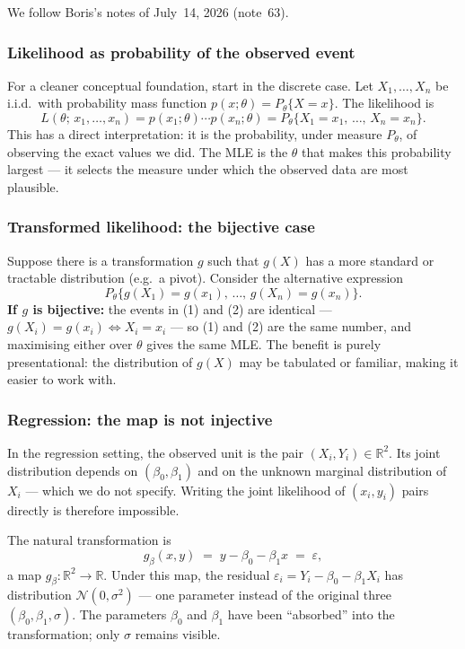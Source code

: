 \documentclass[a4paper,oneside,12pt]{extarticle}
\theoremstyle{plain}
\theoremstyle{definition}
\theoremstyle{remark}
\begin{document}
We follow Boris's notes of July~14, 2026 (note~63).

\subsubsection*{Likelihood as probability of the observed event}

For a cleaner conceptual foundation, start in the discrete case.
Let $X_1,\ldots,X_n$ be i.i.d.\ with probability mass function
$p(x;\theta) = P_\theta\{X = x\}$.  The likelihood is
\[
  L(\theta;\,x_1,\ldots,x_n)
  = p(x_1;\theta)\cdots p(x_n;\theta)
  = P_\theta\{X_1 = x_1,\,\ldots,\,X_n = x_n\}.
  \tag{1}
\]
This has a direct interpretation: it is the probability, under
measure $P_\theta$, of observing the exact values we did.
The MLE is the $\theta$ that makes this probability largest ---
it selects the measure under which the observed data are most
plausible.

\subsubsection*{Transformed likelihood: the bijective case}

Suppose there is a transformation $g$ such that $g(X)$ has a more
standard or tractable distribution (e.g.\ a pivot).  Consider the
alternative expression
\[
  P_\theta\{g(X_1) = g(x_1),\,\ldots,\,g(X_n) = g(x_n)\}.
  \tag{2}
\]
\textbf{If $g$ is bijective:} the events in (1) and (2) are
identical --- $g(X_i) = g(x_i) \Leftrightarrow X_i = x_i$ ---
so (1) and (2) are the same number, and maximising either over
$\theta$ gives the same MLE.  The benefit is purely
presentational: the distribution of $g(X)$ may be tabulated or
familiar, making it easier to work with.

\subsubsection*{Regression: the map is not injective}

In the regression setting, the observed unit is the pair
$(X_i, Y_i) \in \mathbb{R}^2$.  Its joint distribution depends on
$(\beta_0, \beta_1)$ and on the unknown marginal distribution of
$X_i$ --- which we do not specify.  Writing the joint likelihood of
$(x_i, y_i)$ pairs directly is therefore impossible.

The natural transformation is
\[
  g_\beta(x, y) \;=\; y - \beta_0 - \beta_1 x \;=\; \varepsilon,
\]
a map $g_\beta : \mathbb{R}^2 \to \mathbb{R}$.  Under this map,
the residual $\varepsilon_i = Y_i - \beta_0 - \beta_1 X_i$ has
distribution $\mathcal{N}(0,\sigma^2)$ --- one parameter instead
of the original three $(\beta_0,\beta_1,\sigma)$.  The parameters
$\beta_0$ and $\beta_1$ have been ``absorbed'' into the
transformation; only $\sigma$ remains visible.
\end{document}
